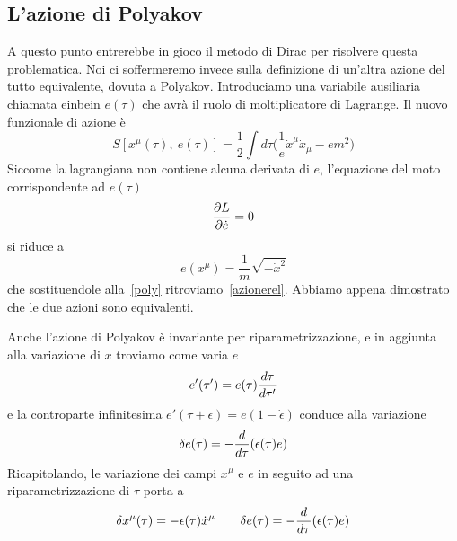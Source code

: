 \subsection{L'azione di Polyakov}
    A questo punto entrerebbe in gioco il metodo di Dirac per risolvere questa problematica. Noi ci soffermeremo invece sulla definizione di un'altra azione del tutto equivalente, dovuta a Polyakov. Introduciamo una variabile ausiliaria chiamata einbein $e(\tau)$ che avrà il ruolo di moltiplicatore di Lagrange. Il nuovo funzionale di azione è
\begin{equation} \label{poly}
    S[x^\mu(\tau), ~ e(\tau)] = \frac{1}{2} \int d\tau \Big( \frac{1}{e} \dot x^\mu \dot x_\mu - e m^2 \Big)
\end{equation}
    Siccome la lagrangiana non contiene alcuna derivata di $e$, l'equazione del moto corrispondente ad $e(\tau)$ 
\begin{equation*}
    \frac{\partial L}{\partial\dot e} = 0
\end{equation*}
    si riduce a
\begin{equation*}
    e(x^\mu) = \frac{1}{m} \sqrt{-\dot x^2}
\end{equation*}
    che sostituendole alla~\eqref{poly} ritroviamo~\eqref{azionerel}. Abbiamo appena dimostrato che le due azioni sono equivalenti. 

    Anche l'azione di Polyakov è invariante per riparametrizzazione, e in aggiunta alla variazione di $x$ troviamo come varia $e$
\begin{equation*}
    e'(\tau') = e(\tau) \frac{d\tau}{d\tau'}
\end{equation*}
    e la controparte infinitesima $e'(\tau + \epsilon) = e(1 - \dot \epsilon)$ conduce alla variazione
\begin{equation*}
    \delta e(\tau) = - \frac{d}{d\tau} (\epsilon(\tau) e)
\end{equation*}
    Ricapitolando, le variazione dei campi $x^\mu$ e $e$ in seguito ad una riparametrizzazione di $\tau$ porta a 
\begin{equation} \label{varcamp}
    \delta x^\mu(\tau) = - \epsilon(\tau) \dot x^\mu \qquad \delta e(\tau) = - \frac{d}{d\tau} (\epsilon(\tau) e)
\end{equation}

